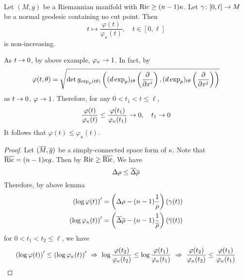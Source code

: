 \begin{enumerate}[label=\arabic{*}]
	\begin{thm}[Bishop]
		Let $(M,g)$ be a Riemannian manifold with $\operatorname{Ric} \geq (n-1)\kappa$. Let $\gamma \colon [0,\ell] \rightarrow M$ be a normal geodesic containing no cut point. Then
		\begin{equation*}
			t \mapsto \frac{\varphi(t)}{\varphi_\kappa(t)},\quad t \in [0,\ell]
		\end{equation*}
		is non-increasing.
	\end{thm}
	\begin{rmk}
		As $t \rightarrow 0$, by above example, $\varphi_\kappa \rightarrow 1$. In fact, by
		\begin{equation*}
			\varphi(t,\theta) = \sqrt{\det g_{\exp_p(t\theta)}\left((d\exp_p)_{t\theta}\left(\frac{\partial}{\partial x^i}\right),(d\exp_p)_{t\theta}\left(\frac{\partial}{\partial x^j}\right)\right)}
		\end{equation*}
		as $t \rightarrow 0$, $\varphi \rightarrow 1$. Therefore, for any $0 < t_1 < t \leq \ell$,
		\begin{equation*}
			\frac{\varphi(t)}{\varphi_\kappa(t)} \leq \frac{\varphi(t_1)}{\varphi_\kappa(t_1)} \rightarrow 0,\quad t_1 \rightarrow 0
		\end{equation*}
		It follows that $\varphi(t) \leq \varphi_\kappa(t)$.
	\end{rmk}
	\begin{proof}
		Let $(\overline{M},\overline{g})$ be a simply-connected space form of $\kappa$. Note that $\overline{\operatorname{Ric}} = (n-1)\kappa g$. Then by $\operatorname{Ric} \geq \overline{\operatorname{Ric}}$, We have
		\begin{equation*}
			\Delta \rho \leq \overline{\Delta} \overline{\rho}
		\end{equation*}
		Therefore, by above lemma
		\begin{equation*}
			\begin{aligned}
				\left(\log \varphi(t) \right)^\prime &= \left(\Delta \rho - (n-1)\frac{1}{\rho}\right)(\gamma(t)) \\
				\left(\log \varphi_\kappa(t) \right)^\prime &= \left(\overline{\Delta} \overline{\rho} - (n-1)\frac{1}{\overline{\rho}}\right)(\overline{\gamma}(t))
			\end{aligned}
		\end{equation*}
		for $0<t_1 < t_2 \leq \ell$, we have
		\begin{equation*}
			\left(\log \varphi(t) \right)^\prime \leq \left(\log \varphi_\kappa(t) \right)^\prime ~\Rightarrow~ \log \frac{\varphi(t_2)}{\varphi_\kappa(t_2)} \leq \log \frac{\varphi(t_1)}{\varphi_\kappa(t_1)} ~\Rightarrow~\frac{\varphi(t_2)}{\varphi_\kappa(t_2)} \leq \frac{\varphi(t_1)}{\varphi_\kappa(t_1)} \qedhere
		\end{equation*}
	\end{proof}


\end{enumerate}
